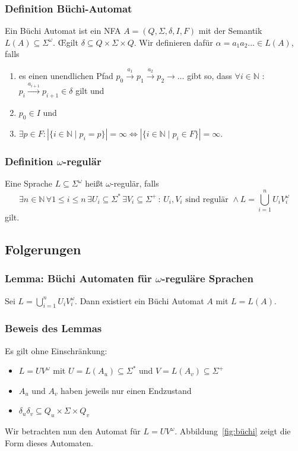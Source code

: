 \documentclass[12pt, german]{article}
\newcommand{\N}{\mathbb{N}}
\newcommand{\sigstern}{\Sigma^\ast}
\newcommand{\pom}{^{\omega}}
\newcommand{\splu}{\Sigma^{+}}
\newcommand{\oei}{\OE\hspace{2pt}}
\begin{document}
\subsubsection{Definition Büchi-Automat}
	Ein Büchi Automat ist ein NFA $A = (Q, \Sigma, \delta, I, F)$ mit der Semantik $L(A) \subseteq \Sigma\pom$.
	\oei gilt $\delta \subseteq Q \times \Sigma \times Q$.
	Wir definieren dafür $\alpha = a_1a_2\ldots \in L(A)$, falls
	\begin{enumerate}[label = \arabic*.)]
		\item es einen unendlichen Pfad $p_0 \overset{a_1}{\longrightarrow}p_1 \overset{a_2}{\longrightarrow} p_2 \longrightarrow \ldots$ gibt so, dass $\forall i\in \N$ : $p_i \overset{a_{i+1}}{\longrightarrow} p_{i+1} \in \delta$ gilt und
		\item $p_0 \in I$  und
		\item $\exists p \in F : |\{i \in \N \mid p_i = p\}| = \infty \iff |\{i \in \N \mid p_i \in F\}| = \infty$.
	\end{enumerate}

\subsubsection{Definition $\omega$-regulär}
	Eine Sprache $L \subseteq \Sigma\pom$ hei\ss t $\omega$-regulär, falls $$\exists n \in \N \, \forall 1 \leq i \leq n \, \exists U_i \subseteq \sigstern\, \exists V_i \subseteq \splu \, : \, U_i, V_i \text{ sind regulär }\land L = \bigcup_{i = 1}^n U_i V_i\pom$$
	gilt.
	
\subsection{Folgerungen}
\subsubsection{Lemma: Büchi Automaten für $\omega$-reguläre Sprachen}
	Sei $L = \bigcup_{i = 1}^n U_i V_i\pom$. Dann existiert ein Büchi Automat $A$ mit $L=L(A)$.

\subsubsection{Beweis des Lemmas}
	Es gilt ohne Einschränkung: 
	\begin{itemize}
		\item $L = UV\pom$ mit $U = L(A_u) \subseteq \sigstern$ und $V = L(A_v) \subseteq \splu$
		\item $A_u$ und $A_v$ haben jeweils nur einen Endzustand
		\item $\delta_u \delta_v \subseteq Q_u \times \Sigma \times Q_v$
	\end{itemize}
	Wir betrachten nun den Automat für $L = UV\pom$. 
	Abbildung~\ref{fig:büchi} zeigt die Form dieses Automaten.
	
\end{document}
